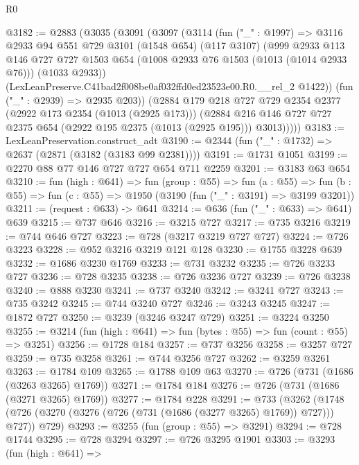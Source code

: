 \begin{lexlean}{R0}
\begin{coremodule}
@3182 := @2883
    (@3035
      (@3091
        (@3097
          (@3114
            (fun ("_" : @1997) =>
            @3116
              @2933
              @94
              @551
              @729
              @3101
              (@1548 @654)
              (@117 @3107)
              (@999
                @2933
                @113
                @146
                @727
                @727
                @1503
                @654
                (@1008 @2933 @76 @1503 (@1013 (@1014 @2933 @76)))
                (@1033 @2933))
              (LexLeanPreserve.C41bad2f008be0af032ffd0ed23523e00.R0.__rel_2 @1422))
            (fun ("_" : @2939) => @2935 @203))
          (@2884
            @179
            @218
            @727
            @729
            @2354
            @2377
            (@2922 @173 @2354 (@1013 (@2925 @173)))
            (@2884 @216 @146 @727 @727 @2375 @654 (@2922 @195 @2375 (@1013 (@2925 @195))) @3013)))))
@3183 := LexLeanPreservation.construct_adt
@3190 := @2344 (fun ("_" : @1732) => @2637 (@2871 (@3182 (@3183 @99 @2381))))
@3191 := @1731 @1051
@3199 := @2270 @88 @77 @146 @727 @727 @654 @711 @2259
@3201 := @3183 @63 @654
@3210 := fun (high : @641) =>
  fun (group : @55) =>
  fun (a : @55) =>
  fun (b : @55) => fun (c : @55) => @1950 (@3190 (fun ("_" : @3191) => @3199 @3201))
@3211 := (request : @633) -> @641
@3214 := @636 (fun ("_" : @633) => @641) @639
@3215 := @737 @646
@3216 := @3215 @727
@3217 := @735 @3216
@3219 := @744 @646 @727
@3223 := @728 (@3217 @3219 @727 @727)
@3224 := @726 @3223
@3228 := @952 @3216 @3219 @121 @128
@3230 := @1755 @3228 @639
@3232 := @1686 @3230 @1769
@3233 := @731 @3232
@3235 := @726 @3233 @727
@3236 := @728 @3235
@3238 := @726 @3236 @727
@3239 := @726 @3238
@3240 := @888 @3230
@3241 := @737 @3240
@3242 := @3241 @727
@3243 := @735 @3242
@3245 := @744 @3240 @727
@3246 := @3243 @3245
@3247 := @1872 @727
@3250 := @3239 (@3246 @3247 @729)
@3251 := @3224 @3250
@3255 := @3214 (fun (high : @641) => fun (bytes : @55) => fun (count : @55) => @3251)
@3256 := @1728 @184
@3257 := @737 @3256
@3258 := @3257 @727
@3259 := @735 @3258
@3261 := @744 @3256 @727
@3262 := @3259 @3261
@3263 := @1784 @109
@3265 := @1788 @109 @63
@3270 := @726 (@731 (@1686 (@3263 @3265) @1769))
@3271 := @1784 @184
@3276 := @726 (@731 (@1686 (@3271 @3265) @1769))
@3277 := @1784 @228
@3291 := @733
    (@3262 (@1748 (@726 (@3270 (@3276 (@726 (@731 (@1686 (@3277 @3265) @1769)) @727))) @727)) @729)
@3293 := @3255 (fun (group : @55) => @3291)
@3294 := @728 @1744
@3295 := @728 @3294
@3297 := @726 @3295 @1901
@3303 := @3293
    (fun (high : @641) =>

\end{coremodule}
\end{lexlean}
